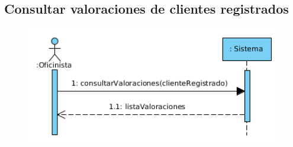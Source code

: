 \subsection{Consultar valoraciones de clientes registrados}
\begin{figure}[H]
	\centering
	\includegraphics[width=16cm]{63}
\end{figure}
\newpage

